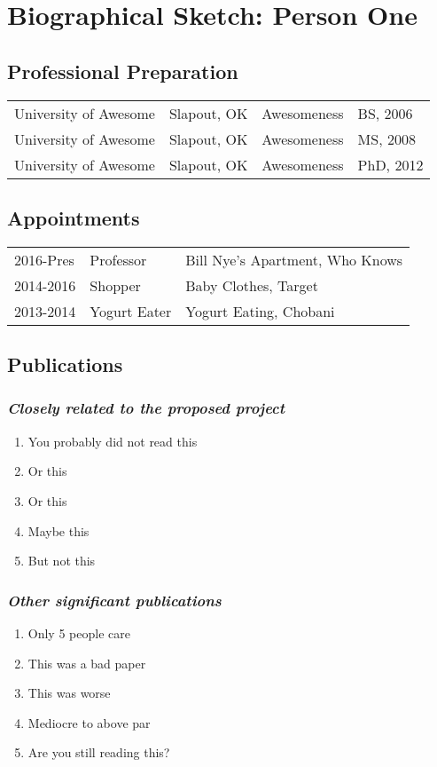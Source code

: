 \setcounter{subsection}{0}
\renewcommand\thesubsection{(\alph{subsection})}
\renewcommand\thesubsubsection{\textit{(\roman{subsubsection})}}

\section*{Biographical Sketch: Person One}

\subsection{Professional Preparation}
\begin{tabular}[c]{llll}
University of Awesome & Slapout, OK & Awesomeness & BS, 2006\\
University of Awesome & Slapout, OK & Awesomeness & MS, 2008\\
University of Awesome & Slapout, OK & Awesomeness & PhD, 2012\\
\end{tabular}

\subsection{Appointments}
\begin{tabularx}{\textwidth}{ l l Y }
2016-Pres & Professor & Bill Nye's Apartment, Who Knows \\
2014-2016 & Shopper & Baby Clothes, Target \\
2013-2014 & Yogurt Eater & Yogurt Eating, Chobani \\
\end{tabularx}

\subsection{Publications}
\subsubsection{\textit{Closely related to the proposed project}}
\begin{enumerate}
\item You probably did not read this
\item Or this
\item Or this
\item Maybe this
\item But not this
\end{enumerate}
\subsubsection{\textit{Other significant publications}}
\begin{enumerate}
\item Only 5 people care
\item This was a bad paper
\item This was worse
\item Mediocre to above par
\item Are you still reading this?
\end{enumerate}

